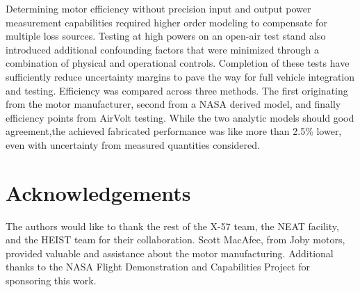 \documentclass[]{aiaa-tc}%
\begin{document}
Determining motor efficiency without precision input and output power measurement capabilities required higher order modeling to compensate for multiple loss sources. 
Testing at high powers on an open-air test stand also introduced additional confounding factors that were minimized through a combination of physical and operational controls.
Completion of these tests have sufficiently reduce uncertainty margins to pave the way for full vehicle integration and testing. Efficiency was compared across three methods. The first originating from the motor manufacturer, second from a NASA derived model, and finally efficiency points from AirVolt testing. While the two analytic models should good agreement,the achieved fabricated performance was like more than 2.5\% lower, even with uncertainty from measured quantities considered.


\section{Acknowledgements}

The authors would like to thank the rest of the X-57 team, the NEAT facility, and the HEIST team for their collaboration. Scott MacAfee, from Joby motors, provided valuable and assistance about the motor manufacturing. Additional thanks to the NASA Flight Demonstration and Capabilities Project for sponsoring this work.




\end{document}
